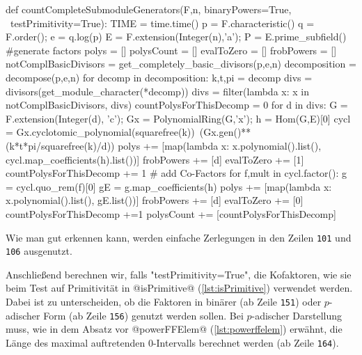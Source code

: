 \begin{sagecode}[caption={Aus \url{../Sage/enumeratePCNs.spyx}},
  firstnumber=88]
def countCompleteSubmoduleGenerators(F,n, binaryPowers=True, \
        testPrimitivity=True):
    TIME = time.time()
    p = F.characteristic()
    q = F.order();
    e = q.log(p)
    E = F.extension(Integer(n),'a');
    P = E.prime_subfield()
    #generate factors
    polys = []
    polysCount = []
    evalToZero = []
    frobPowers = []
    notComplBasicDivisors = get_completely_basic_divisors(p,e,n)
    decomposition = decompose(p,e,n)
    for decomp in decomposition:
        k,t,pi = decomp
        divs = divisors(get_module_character(*decomp))
        divs = filter(lambda x: x in notComplBasicDivisors, divs)
        countPolysForThisDecomp = 0
        for d in divs:
            G = F.extension(Integer(d), 'c');
            Gx = PolynomialRing(G,'x'); 
            h = Hom(G,E)[0]
            cycl = Gx.cyclotomic_polynomial(squarefree(k))\
                    (Gx.gen()**(k*t*pi/squarefree(k)/d))
            polys += [map(lambda x: x.polynomial().list(),
                cycl.map_coefficients(h).list())]
            frobPowers += [d]
            evalToZero += [1]
            countPolysForThisDecomp += 1
            # add Co-Factors
            for f,mult in cycl.factor():
                g = cycl.quo_rem(f)[0]
                gE = g.map_coefficients(h)
                polys += [map(lambda x: x.polynomial().list(), gE.list())]
                frobPowers += [d]
                evalToZero += [0]
                countPolysForThisDecomp +=1
        polysCount += [countPolysForThisDecomp]
\end{sagecode}

Wie man gut erkennen kann, werden einfache Zerlegungen in den Zeilen
\texttt{101} und \texttt{106} ausgenutzt.

Anschließend berechnen wir, falls "testPrimitivity=True",
die Kofaktoren, wie sie beim Test auf Primitivität
in @isPrimitive@ (\autoref{lst:isPrimitive}) verwendet werden. Dabei ist zu
unterscheiden, ob die Faktoren in binärer (ab Zeile \texttt{151})
oder $p$-adischer Form (ab Zeile \texttt{156}) genutzt werden
sollen. Bei $p$-adischer Darstellung muss, wie in dem Absatz vor 
@powerFFElem@ (\autoref{lst:powerffelem}) erwähnt, die Länge des maximal
auftretenden $0$-Intervalls berechnet werden (ab Zeile \texttt{164}).

